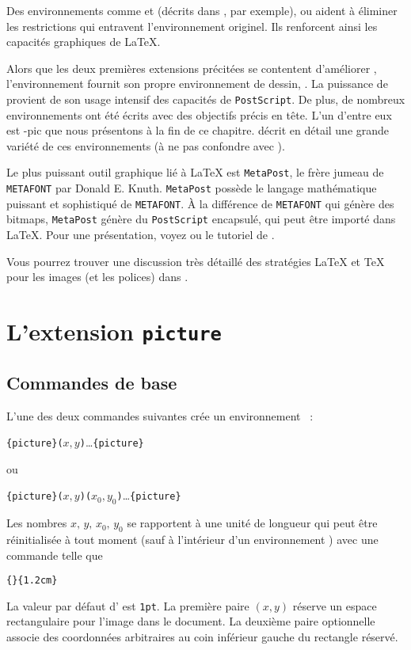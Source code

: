 Des environnements comme  et  (décrits dans
\companion, par exemple), ou  aident à éliminer les
restrictions qui entravent l'environnement  originel. Ils
renforcent ainsi les capacités graphiques de \LaTeX.

Alors que les deux premières extensions précitées se contentent
d'améliorer , l'environnement  fournit son
propre environnement de dessin, . La puissance de
 provient de son usage intensif des capacités de
\texttt{PostScript}. De plus, de nombreux environnements ont été
écrits avec des objectifs précis en tête. L'un d'entre eux est
\texorpdfstring{\Xy}{Xy}-pic que nous présentons à la fin de ce
chapitre. \graphicscompanion{} décrit en détail une grande variété de
ces environnements (à ne pas confondre avec \companion).

Le plus puissant outil graphique lié à \LaTeX{} est \texttt{MetaPost},
le frère jumeau de \texttt{METAFONT} par Donald
E. Knuth. \texttt{MetaPost} possède le langage mathématique puissant
et sophistiqué de \texttt{METAFONT}. À la différence de
\texttt{METAFONT} qui génère des bitmaps, \texttt{MetaPost} génère du
\texttt{PostScript} encapsulé, qui peut être importé dans \LaTeX. Pour
une présentation, voyez \hobby ou le tutoriel de \cite{ursoswald}.

Vous pourrez trouver une discussion très détaillé des stratégies
\LaTeX{} et \TeX{} pour les images (et les polices) dans \hoenig.


\section{L'extension \texttt{picture}}

\subsection{Commandes de base}

L'une des deux commandes suivantes crée un environnement
~:
\begin{lscommand}
\verb|{picture}(|$x,y$\verb|)|\ldots{}\verb|{picture}|
\end{lscommand}
\noindent ou
\begin{lscommand}
\verb|{picture}(|$x,y$\verb|)(|$x_0,y_0$\verb|)|\ldots{}\verb|{picture}|
\end{lscommand}
Les nombres $x,\,y,\,x_0,\,y_0$ se rapportent à une unité de longueur
 qui peut être réinitialisée à tout moment (sauf à
l'intérieur d'un environnement ) avec une commande telle
que
\begin{lscommand}
\verb|{|\verb|}{1.2cm}|
\end{lscommand}
La valeur par défaut d' est \texttt{1pt}. La première
paire $(x,y)$ réserve un espace rectangulaire pour l'image dans le
document. La deuxième paire optionnelle associe des coordonnées
arbitraires au coin inférieur gauche du rectangle réservé.

